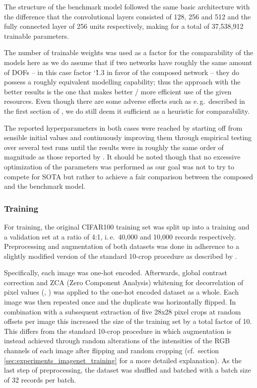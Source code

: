 The structure of the benchmark model followed the same basic architecture with the difference that the convolutional layers consisted of 128, 256 and 512 and the fully connected layer of 256 units respectively, making for a total of 37,538,912 trainable parameters.

The number of trainable weights was used as a factor for the comparability of the models here as we do assume that if two networks have roughly the same amount of DOFs -- in this case factor \char`\~1.3 in favor of the composed network -- they do possess a roughly equivalent modelling capability; thus the approach with the better results is the one that makes better / more efficient use of the given resources. Even though there are some adverse effects such as e.\,g.\ described in the first section of \cite{He2015-cq}, we do still deem it sufficient as a heuristic for comparability.

The reported hyperparameters in both cases were reached by starting off from sensible initial values and continuously improving them through empirical testing over several test runs until the results were in roughly the same order of magnitude as those reported by \cite{Goodfellow2013-za}. It should be noted though that no excessive optimization of the parameters was performed as our goal was not to try to compete for SOTA but rather to achieve a fair comparison between the composed and the benchmark model.
               
\subsubsection{Training%
               \label{sec:experiments_cifar100_training}}

For training, the original CIFAR100 training set was split up into a training and a validation set at a ratio of 4:1, i.\,e.\ 40,000 and 10,000 records respectively. Preprocessing and augmentation of both datasets was done in adherence to a slightly modified version of the standard 10-crop procedure as described by \cite{Krizhevsky2012-jr}.

Specifically, each image was one-hot encoded. Afterwards, global contrast correction and ZCA (Zero Component Analysis) whitening for decorrelation of pixel values (\cite{Krizhevsky2009-wt}, \cite{Goodfellow2013-za}) was applied to the one-hot encoded dataset as a whole. Each image was then repeated once and the duplicate was horizontally flipped. In combination with a subsequent extraction of five 28x28 pixel crops at random offsets per image this increased the size of the training set by a total factor of 10. This differs from the standard 10-crop procedure in which augmentation is instead achieved through random alterations of the intensities of the RGB channels of each image after flipping and random cropping (cf.\ section \ref{sec:experiments_imagenet_training} for a more detailed explanation). As the last step of preprocessing, the dataset was shuffled and batched with a batch size of 32 records per batch.


